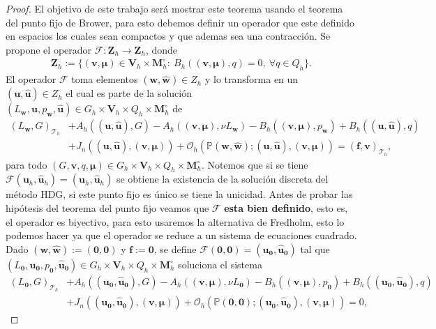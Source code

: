 \documentclass[10pt,a4paper]{report}
\newcommand{\bs}{\boldsymbol}
\newcommand{\Th}{\mathscr{T}_{h}}
\providecommand{\Pii}[2]{\left( #1,#2  \right)}
\begin{document}
    \begin{proof}
    El objetivo de este trabajo será mostrar este teorema usando el teorema del punto fijo de Brower, para esto debemos definir un operador que este definido en espacios los cuales sean compactos y que ademas sea una contracción. Se propone el operador $\mathcal{F}:\bs{Z}_{h}\longrightarrow \bs{Z}_{h}$, donde 
    \begin{align*}
    	\bs{Z}_{h} := \{ (\bs{v},\bs{\mu})\in \bs{V}_{h}\times \bs{M}^{\circ}_{h}:\ B_{h}\left((\bs{v},\bs{\mu}),q\right) = 0,\ \forall q\in Q_{h} \}.
    \end{align*}
    El operador $\mathcal{F}$ toma elementos $(\bs{w},\bs{\hat{w}})\in Z_{h}$ y lo transforma en un $(\bs{u},\bs{\hat{u}})\in Z_{h}$ el cual es parte de la solución $(L_{\bs{w}},\bs{u},p_{\bs{w}},\bs{\hat{u}})\in  G_{h}\times\bs{V}_{h}\times Q_{h}\times \bs{M}^{\circ}_{h}$ de 
    \begin{align*}
    	\Pii{L_{\bs{w}}}{G}_{\Th} &+ A_{h}\left((\bs{u},\bs{\hat{u}}),G\right) - A_{h}\left((\bs{v},\bs{\mu}),\nu L_{\bs{w}}\right) - 	B_{h}\left((\bs{v},\bs{\mu}),p_{\bs{w}}\right) + B_{h}\left((\bs{u},\bs{\hat{u}}),q\right)\\ &+ J_{n}\left((\bs{u},\bs{\hat{u}}),(\bs{v},\bs{\mu})\right) + \mathcal{O}_{h}\left(\mathbb{P}(\bs{w},\bs{\hat{w}});(\bs{u},\bs{\hat{u}}),(\bs{v},\bs{\mu})\right) = \Pii{\bs{f}}{\bs{v}}_{\Th},
    \end{align*} 
    para todo $\left(G,\bs{v},q,\bs{\mu}\right)\in G_{h}\times\bs{V}_{h}\times Q_{h}\times \bs{M}^{\circ}_{h}$. Notemos que si se tiene $\mathcal{F}(\bs{u}_{h},\bs{\hat{u}}_{h}) = (\bs{u}_{h},\bs{\hat{u}}_{h})$ se obtiene la existencia de la solución discreta del método HDG, si este punto fijo es único se tiene la unicidad. Antes de probar las hipótesis del teorema del punto fijo veamos que $\bs{\mathcal{F}}$ \textbf{esta bien definido}, esto es, el operador es biyectivo, para esto usaremos la alternativa de Fredholm, esto lo podemos hacer ya que el operador se reduce a un sistema de ecuaciones cuadrado. Dado $(\bs{w},\bs{\hat{w}}) := (\bs{0},\bs{0})$ y $\bs{f} := \bs{0}$, se define $\mathcal{F}(\bs{0},\bs{0}) = (\bs{u}_{\bs{0}},\bs{\hat{u}}_{\bs{0}})$ tal que $(L_{\bs{0}},\bs{u}_{\bs{0}},p_{\bs{0}},\bs{\hat{u}}_{\bs{0}})\in  G_{h}\times\bs{V}_{h}\times Q_{h}\times \bs{M}^{\circ}_{h}$ soluciona el sistema
    \begin{align}
    	\Pii{L_{\bs{0}}}{G}_{\Th} &+ A_{h}\left((\bs{u}_{\bs{0}},\bs{\hat{u}}_{\bs{0}}),G\right) - A_{h}\left((\bs{v},\bs{\mu}),\nu L_{\bs{0}}\right) - 	B_{h}\left((\bs{v},\bs{\mu}),p_{\bs{0}}\right) + B_{h}\left((\bs{u}_{\bs{0}},\bs{\hat{u}}_{\bs{0}}),q\right)\nonumber\\ &+ J_{n}\left((\bs{u}_{\bs{0}},\bs{\hat{u}}_{\bs{0}}),(\bs{v},\bs{\mu})\right) + \mathcal{O}_{h}\left(\mathbb{P}(\bs{0},\bs{0});(\bs{u}_{\bs{0}},\bs{\hat{u}}_{\bs{0}}),(\bs{v},\bs{\mu})\right) = 0,\label{eq:fcero}

\end{align}
\end{proof}
\end{document}

